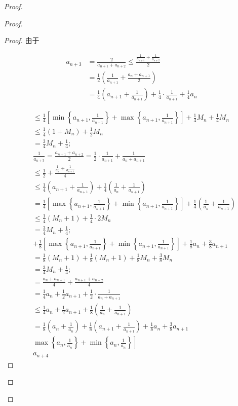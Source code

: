 \begin{proof}
\begin{example}
\begin{solution}
\begin{note}
\begin{solution}
\begin{proof}
\begin{proof}
	由于
	
	$$
	\begin{aligned}
	a_{n+3} & =\frac{2}{a_{n+1}+a_{n+2}} \leqslant \frac{\frac{1}{a_{n+1}}+\frac{1}{a_{n+2}}}{2} \\
	& =\frac{1}{2}\left(\frac{1}{a_{n+1}}+\frac{a_{n}+a_{n+1}}{2}\right) \\
	& =\frac{1}{4}\left(a_{n+1}+\frac{1}{a_{n+1}}\right)+\frac{1}{4} \cdot \frac{1}{a_{n+1}}+\frac{1}{4} a_{n}
	\end{aligned}
	$$
	
	$$
	\begin{aligned}
	& \leqslant \frac{1}{4}\left[\min \left\{a_{n+1}, \frac{1}{a_{n+1}}\right\}+\max \left\{a_{n+1}, \frac{1}{a_{n+1}}\right\}\right]+\frac{1}{4} M_{n}+\frac{1}{4} M_{n} \\
	& \leqslant \frac{1}{4}\left(1+M_{n}\right)+\frac{1}{2} M_{n} \\
	&= \frac{3}{4} M_{n}+\frac{1}{4} ; \\
	& \frac{1}{a_{n+3}}= \frac{a_{n+1}+a_{n+2}}{2}=\frac{1}{2} \cdot \frac{1}{a_{n+1}}+\frac{1}{a_{n}+a_{n+1}} \\
	& \leqslant \frac{1}{2}+\frac{\frac{1}{a_{n}}+\frac{1}{a_{n+1}}}{4} \\
	& \leqslant \frac{1}{4}\left(a_{n+1}+\frac{1}{a_{n+1}}\right)+\frac{1}{4}\left(\frac{1}{a_{n}}+\frac{1}{a_{n+1}}\right) \\
	&= \frac{1}{4}\left[\max \left\{a_{n+1}, \frac{1}{a_{n+1}}\right\}+\min \left\{a_{n+1}, \frac{1}{a_{n+1}}\right\}\right]+\frac{1}{4}\left(\frac{1}{a_{n}}+\frac{1}{a_{n+1}}\right) \\
	& \leqslant \frac{1}{4}\left(M_{n}+1\right)+\frac{1}{4} \cdot 2 M_{n} \\
	&= \frac{3}{4} M_{n}+\frac{1}{4} ; \\
	&+\frac{1}{8}\left[\max \left\{a_{n+1}, \frac{1}{a_{n+1}}\right\}+\min \left\{a_{n+1}, \frac{1}{a_{n+1}}\right\}\right]+\frac{1}{8} a_{n}+\frac{3}{8} a_{n+1} \\
	&= \frac{1}{8}\left(M_{n}+1\right)+\frac{1}{8}\left(M_{n}+1\right)+\frac{1}{8} M_{n}+\frac{3}{8} M_{n} \\
	&= \frac{3}{4} M_{n}+\frac{1}{4} ; \\
	&= \frac{a_{n}+a_{n+1}}{4}+\frac{a_{n+1}+a_{n+2}}{4} \\
	&= \frac{1}{4} a_{n}+\frac{1}{2} a_{n+1}+\frac{1}{2} \cdot \frac{1}{a_{n}+a_{n+1}} \\
	& \leqslant \frac{1}{4} a_{n}+\frac{1}{2} a_{n+1}+\frac{1}{8}\left(\frac{1}{a_{n}}+\frac{1}{a_{n+1}}\right) \\
	&= \frac{1}{8}\left(a_{n}+\frac{1}{a_{n}}\right)+\frac{1}{8}\left(a_{n+1}+\frac{1}{a_{n+1}}\right)+\frac{1}{8} a_{n}+\frac{3}{8} a_{n+1} \\
	&\left.\max \left\{a_{n}, \frac{1}{a_{n}}\right\}+\min \left\{a_{n}, \frac{1}{a_{n}}\right\}\right] \\
	& a_{n+4}
	\end{aligned}
	$$
	

\end{proof}
\end{proof}
\end{solution}
\end{note}
\end{solution}
\end{example}
\end{proof}
